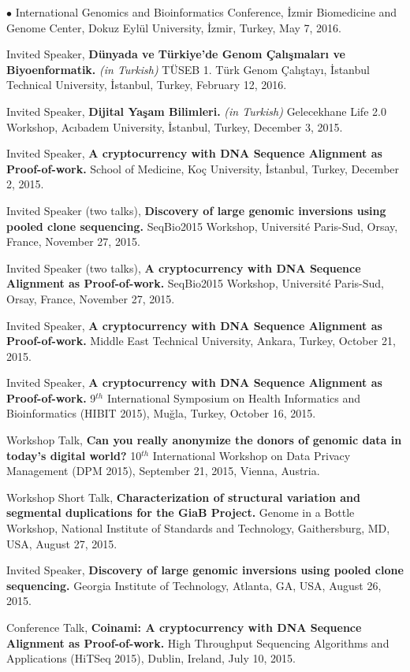 \documentclass[margin,line]{res}
\newenvironment{list2}{
  \begin{list}{$\bullet$}{%
      \setlength{\itemsep}{0in}
      \setlength{\parsep}{0in} \setlength{\parskip}{0in}
      \setlength{\topsep}{0in} \setlength{\partopsep}{0in} 
      \setlength{\leftmargin}{0.2in}}}{\end{list}}
\begin{document}
\begin{resume}
\begin{list2}
  International Genomics and Bioinformatics Conference,
  İzmir Biomedicine and Genome Center, Dokuz Eylül University, İzmir, Turkey, May 7, 2016.
\item
  Invited Speaker,
  {\bf Dünyada ve Türkiye'de Genom Çalışmaları ve Biyoenformatik.} {\it (in Turkish)}
  TÜSEB 1. Türk Genom Çalıştayı, İstanbul Technical University, İstanbul, Turkey, February 12, 2016.
\item
  Invited Speaker,
  {\bf Dijital Yaşam Bilimleri.} {\it (in Turkish)}
  Gelecekhane Life 2.0 Workshop, Acıbadem University, \.{I}stanbul, Turkey, December 3, 2015.
\item
  Invited Speaker,
  {\bf A cryptocurrency with DNA Sequence Alignment as Proof-of-work.}
  School of Medicine, Ko\c{c} University, \.{I}stanbul, Turkey, December 2, 2015.
\item
  Invited Speaker (two talks), 
  {\bf Discovery of large genomic inversions using pooled clone sequencing.}
  SeqBio2015 Workshop, Université Paris-Sud, Orsay, France, November 27, 2015.
\item
  Invited Speaker (two talks), 
  {\bf A cryptocurrency with DNA Sequence Alignment as Proof-of-work.}
  SeqBio2015 Workshop, Université Paris-Sud, Orsay, France, November 27, 2015.
\item
  Invited Speaker,
  {\bf A cryptocurrency with DNA Sequence Alignment as Proof-of-work.}
  Middle East Technical University, Ankara, Turkey, October 21, 2015.
\item
  Invited Speaker,
  {\bf A cryptocurrency with DNA Sequence Alignment as Proof-of-work.}
  9$^{th}$ International Symposium on Health Informatics and Bioinformatics (HIBIT 2015),
   Muğla, Turkey, October 16, 2015.
 \item
  Workshop Talk, 
  {\bf Can you really anonymize the donors of genomic data in today's digital world?}
  10$^{th}$ International Workshop on Data Privacy Management (DPM 2015), 
  September 21, 2015, Vienna, Austria.
\item
  Workshop Short Talk, 
  {\bf Characterization of structural variation and segmental duplications for the GiaB Project.}
  Genome in a Bottle Workshop, National Institute of Standards and Technology, Gaithersburg, MD, USA,
  August 27, 2015.
\item
  Invited Speaker, 
  {\bf Discovery of large genomic inversions using pooled clone sequencing.}
  Georgia Institute of Technology, Atlanta, GA, USA, August 26, 2015.

\item
  Conference Talk, 
  {\bf Coinami: A cryptocurrency with DNA Sequence Alignment as Proof-of-work.}
  High Throughput Sequencing Algorithms and Applications (HiTSeq 2015), Dublin, Ireland, July 10, 2015.


\end{list2}
\end{resume}
\end{document}
